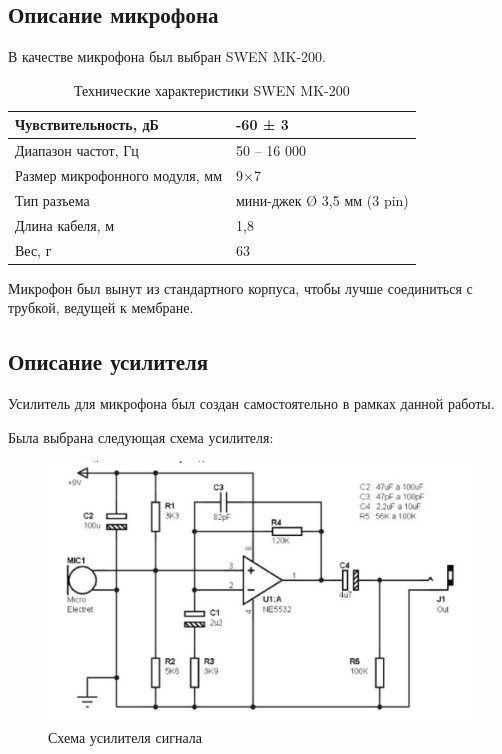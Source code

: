
\subsection{Описание микрофона}
В качестве микрофона был выбран SWEN MK-200. \\

\begin{table}[h]
\centering
\label{my-label}
\begin{tabular}{|l|l|}
\hline
Чувствительность, дБ           & -60 ± 3                    \\ \hline
Диапазон частот, Гц            & 50 – 16 000                \\ \hline
Размер микрофонного модуля, мм & 9×7                        \\ \hline
Тип разъема                    & мини-джек Ø 3,5 мм (3 pin) \\ \hline
Длина кабеля, м                & 1,8                        \\ \hline
Вес, г                         & 63                         \\ \hline
\end{tabular}
\caption{Технические характеристики SWEN MK-200}
\end{table}

Микрофон был вынут из стандартного корпуса, чтобы лучше соединиться с трубкой, ведущей к мембране.

\subsection{Описание усилителя}
Усилитель для микрофона был создан самостоятельно в рамках данной работы.

Была выбрана следующая схема усилителя:

\begin{figure}[H]
\centering
\includegraphics[width=14cm]{circuit.jpg}
\caption{Схема усилителя сигнала}
\end{figure}

